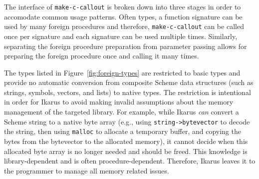 \documentclass[onecolumn, 12pt, twoside, openright, dvipdfm]{book}
\begin{document}
The interface of \texttt{make-c-callout} is broken down into three
stages in order to accomodate common usage patterns.  Often types, a
function signature can be used by many foreign procedures and
therefore, \texttt{make-c-callout} can be called once per signature
and each signature can be used multiple times.  Similarly,
separating the foreign procedure preparation from parameter passing
allows for preparing the foreign procedure once and calling it many
times. 

The types listed in Figure~\ref{fig:foreign-types} are restricted to
basic types and provide no automatic conversion from composite
Scheme data structures (such as strings, symbols, vectors, and
lists) to native types.  The restriction is intentional in order for
Ikarus to avoid making invalid assumptions about the memory
management of the targeted library.  For example, while Ikarus
\emph{can} convert a Scheme string to a native byte array (e.g.,
using \texttt{string->bytevector} to decode the string, then using
\texttt{malloc} to allocate a temporary buffer, and copying the
bytes from the bytevector to the allocated memory), it cannot decide
when this allocated byte array is no longer needed and should be
freed.  This knowledge is library-dependent and is often
procedure-dependent.  Therefore, Ikarus leaves it to the programmer
to manage all memory related issues.
\end{document}
